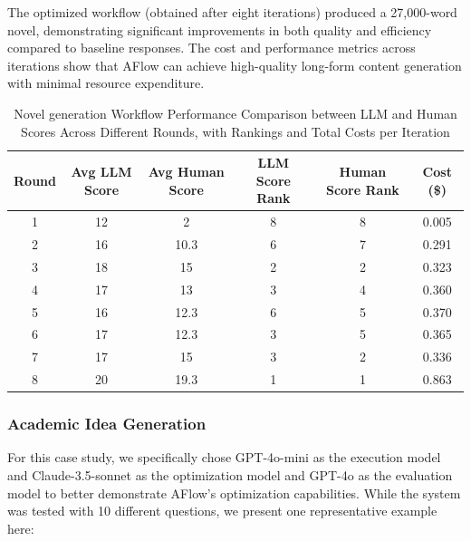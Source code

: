 \documentclass{article} %
\newcommand{\model}{{\sc AFlow}\xspace}
\theoremstyle{plain}
\theoremstyle{definition}
\theoremstyle{remark}
\begin{document}
The optimized workflow (obtained after eight iterations) produced a 27,000-word novel, demonstrating significant improvements in both quality and efficiency compared to baseline responses. The cost and performance metrics across iterations show that \model can achieve high-quality long-form content generation with minimal resource expenditure.

\begin{table}[h]
\renewcommand\arraystretch{1.2}
\setlength{\arrayrulewidth}{0.8pt}
\setlength{\tabcolsep}{4pt}
\setlength{\abovecaptionskip}{0.1cm}
\setlength{\belowcaptionskip}{-0.2cm}
\centering
\begin{tabular*}{\textwidth}{@{\extracolsep{\fill}}cccccc@{}}  
\hline
Round & Avg LLM Score & Avg Human Score & LLM Score Rank & Human Score Rank & Cost (\$) \\
\hline
1 & 12 & 2 & 8 & 8 & 0.005 \\
2 & 16 & 10.3 & 6 & 7 & 0.291 \\
3 & 18 & 15 & 2 & 2 & 0.323 \\
4 & 17 & 13 & 3 & 4 & 0.360 \\
5 & 16 & 12.3 & 6 & 5 & 0.370 \\
6 & 17 & 12.3 & 3 & 5 & 0.365 \\
7 & 17 & 15 & 3 & 2 & 0.336 \\
8 & 20 & 19.3 & 1 & 1 & 0.863 \\
\hline
\end{tabular*}
\caption{Novel generation Workflow Performance Comparison between LLM and Human Scores Across Different Rounds, with Rankings and Total Costs per Iteration}
\label{tab:novel-workflow-performance}
\end{table}



\subsubsection{Academic Idea Generation}
For this case study, we specifically chose GPT-4o-mini as the execution model and Claude-3.5-sonnet as the optimization model and GPT-4o as the evaluation model to better demonstrate \model's optimization capabilities. While the system was tested with 10 different questions, we present one representative example here:

\label{appendix:Idea data}
\end{document}
